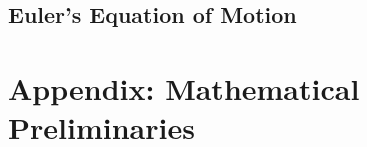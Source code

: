 \subsection{Euler's Equation of Motion}








\newpage
\appendix
\section{Appendix: Mathematical Preliminaries}
